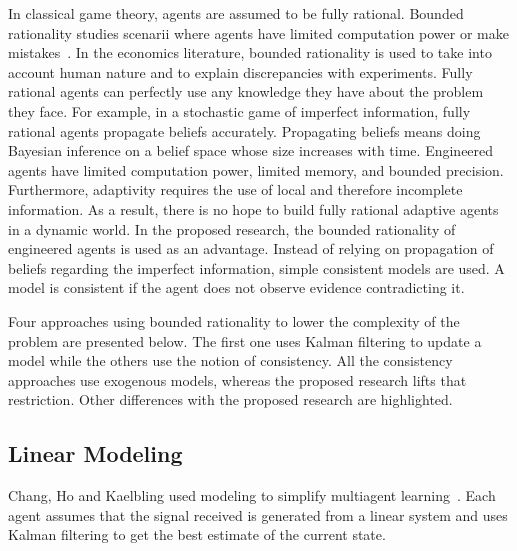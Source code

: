 In classical game theory, agents are assumed to be fully rational.
Bounded rationality studies scenarii where agents have limited computation power or make mistakes~\cite{rubinstein:1998}.
In the economics literature, bounded rationality is used to take into account human nature and to explain discrepancies with experiments.
Fully rational agents can perfectly use any knowledge they have about the problem they face.
For example, in a stochastic game of imperfect information, fully rational agents propagate beliefs accurately.
Propagating beliefs means doing Bayesian inference on a belief space whose size increases with time.
Engineered agents have limited computation power, limited memory, and bounded precision.
Furthermore, adaptivity requires the use of local and therefore incomplete information.
As a result, there is no hope to build fully rational adaptive agents in a dynamic world.
In the proposed research, the bounded rationality of engineered agents is used as an advantage.
Instead of relying on propagation of beliefs regarding the imperfect information, simple consistent models are used.
A model is consistent if the agent does not observe evidence contradicting it.

Four approaches using bounded rationality to lower the complexity of the problem are presented below.
The first one uses Kalman filtering to update a model while the others use the notion of consistency.
All the consistency approaches use exogenous models, whereas the proposed research lifts that restriction.
Other differences with the proposed research are highlighted.

\subsection{Linear Modeling}
Chang, Ho and Kaelbling used modeling to simplify multiagent learning~\cite{chang_ho_kaelbling:2004}.
Each agent assumes that the signal received is generated from a linear system and uses Kalman filtering to get the best estimate of the current state.

